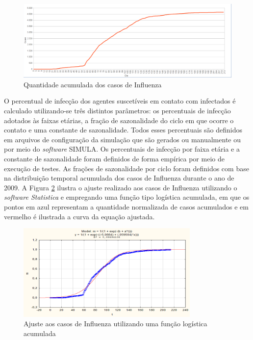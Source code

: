 \begin{figure}[H]
  \centering
  \includegraphics[width=1\textwidth]{Figuras/TratamentosDados/CasosAcumulados.png}
  \caption{Quantidade acumulada dos casos de Influenza}
  \label{fig:casos_acumulados}
\end{figure} 

O percentual de infecção dos agentes suscetíveis em contato com infectados é calculado utilizando-se três distintos parâmetros: os percentuais de infecção adotados às faixas etárias, a fração de sazonalidade do ciclo em que ocorre o contato e uma constante de sazonalidade. Todos esses percentuais são definidos em arquivos de configuração da simulação que são gerados ou manualmente ou por meio do \textit{software} SIMULA. Os percentuais de infecção por faixa etária e a constante de sazonalidade foram definidos de forma empírica por meio de execução de testes. As frações de sazonalidade por ciclo foram definidos com base na distribuição temporal acumulada dos casos de Influenza durante o ano de 2009. A Figura \ref{fig:curva_teorica} ilustra o ajuste realizado aos casos de Influenza utilizando o \textit{software Statistica} e empregando uma função tipo logística acumulada, em que os pontos em azul representam a quantidade normalizada de casos acumulados e em vermelho é ilustrada a curva da equação ajustada. 

\begin{figure}[H]
  \centering
  \includegraphics[width=0.8\textwidth]{Figuras/TratamentosDados/Teorico.png}
  \caption{Ajuste aos casos de Influenza utilizando uma função logística acumulada}
  \label{fig:curva_teorica}
\end{figure} 

